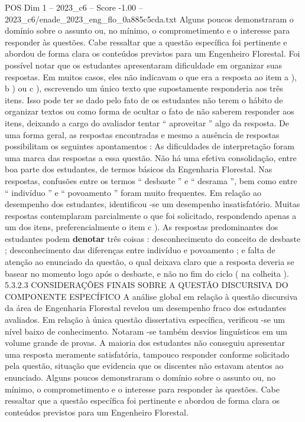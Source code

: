 \begin{textsample}{POS Dim 1 – 2023\_c6 – Score -1.00 – 2023\_c6/enade\_2023\_eng\_flo\_0a885c5cda.txt}
Alguns poucos demonstraram o domínio sobre o assunto ou, no mínimo, o comprometimento e o interesse para responder às questões.
Cabe ressaltar que a questão específica foi pertinente e abordou de forma clara os conteúdos previstos para um Engenheiro Florestal.
Foi possível notar que os estudantes apresentaram dificuldade em organizar suas respostas.
Em muitos casos, eles não indicavam o que era a resposta ao item a ), b ) ou c ), escrevendo um único texto que supostamente responderia aos três itens.
Isso pode ter se dado pelo fato de os estudantes não terem o hábito de organizar textos ou como forma de ocultar o fato de não saberem responder aos itens, deixando a cargo do avaliador tentar “ aproveitar ” algo da resposta.
De uma forma geral, as respostas encontradas e mesmo a ausência de respostas possibilitam os seguintes apontamentos : As dificuldades de interpretação foram uma marca das respostas a essa questão.
Não há uma efetiva consolidação, entre boa parte dos estudantes, de termos básicos da Engenharia Florestal.
Nas respostas, confusões entre os termos “ desbaste ” e “ desrama ”, bem como entre “ indivíduo ” e “ povoamento ” foram muito frequentes.
Em relação ao desempenho dos estudantes, identificou -se um desempenho insatisfatório.
Muitas respostas contemplaram parcialmente o que foi solicitado, respondendo apenas a um dos itens, preferencialmente o item c ).
As respostas predominantes dos estudantes podem \textbf{denotar} três coisas : desconhecimento do conceito de desbaste ; desconhecimento das diferenças entre indivíduo e povoamento ; e falta de atenção ao enunciado da questão, o qual deixava claro que a resposta deveria se basear no momento logo após o desbaste, e não no fim do ciclo ( na colheita ). 5.3.2.3 CONSIDERAÇÕES FINAIS SOBRE A QUESTÃO DISCURSIVA DO COMPONENTE ESPECÍFICO A análise global em relação à questão discursiva da área de Engenharia Florestal revelou um desempenho fraco dos estudantes avaliados.
Em relação à única questão dissertativa específica, verificou -se um nível baixo de conhecimento.
Notaram -se também desvios linguísticos em um volume grande de provas.
A maioria dos estudantes não conseguiu apresentar uma resposta meramente satisfatória, tampouco responder conforme solicitado pela questão, situação que evidencia que os discentes não estavam atentos ao enunciado.
Alguns poucos demonstraram o domínio sobre o assunto ou, no mínimo, o comprometimento e o interesse para responder às questões.
Cabe ressaltar que a questão específica foi pertinente e abordou de forma clara os conteúdos previstos para um Engenheiro Florestal.

\end{textsample}
